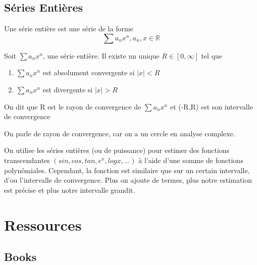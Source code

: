 \documentclass{article}
\begin{document}
\subsection{Séries Entières}

\begin{definition}
    Une série entière est une série de la forme
    $$ \sum a_n x^n, a_n , x \in \mathbb{R}$$
\end{definition}

\begin{theorem}
    Soit $ \sum a_n x^n$, une série entière. Il existe un unique $R \in
    [0, \infty]$ tel que
    \begin{enumerate}
	\item $ \sum a_n x^n$ est absolument convergente si $|x|<R$
	\item $ \sum a_n x^n$ est divergente si $|x|>R$
    \end{enumerate}
    On dit que R est le rayon de convergence de $ \sum a_n x^n$ et (-R,R)
    est son intervalle de convergence
\end{theorem}

\begin{remark}
    On parle de rayon de convergence, car on a un cercle en analyse
    complexe.
\end{remark}

\begin{remark}
    On utilise les séries entières (ou de puissance) pour estimer des
    fonctions transcendantes $(sin, cos, tan, e^x, log x, ...)$ à
    l'aide d'une somme de fonctions polynômiales. Cependant, la fonction
    est similaire que sur un certain intervalle, d'ou l'intervalle de
    convergence. Plus on ajoute de termes, plus notre estimation est
    précise et plus notre intervalle grandit.
\end{remark}

\pagebreak

\section{Ressources}

\subsection{Books}%
\label{sub:Books}
\end{document}
